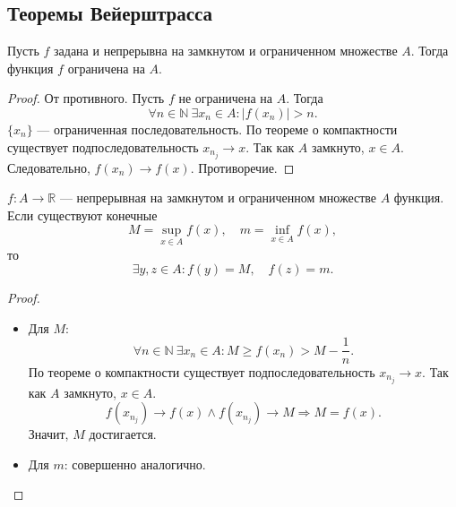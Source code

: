 \documentclass[11pt]{book}
\newcommand{\N}{\mathbb{N}}
\newcommand{\R}{\mathbb{R}}
\renewcommand{\ge}{\geqslant}
\theoremstyle{definition}
\theoremstyle{plain}
\theoremstyle{plain}
\theoremstyle{definition}
\theoremstyle{remark}
\begin{document}
\subsection{Теоремы Вейерштрасса}\label{th_ve_1}
\begin{thm}
    Пусть $ f$ задана и непрерывна на замкнутом и ограниченном множестве  $ A$. Тогда функция  $ f$ ограничена на  $ A$.
\end{thm}
\begin{proof}
    От противного. Пусть $ f$ не ограничена на $ A$. Тогда
    \[
	\forall n \in \N ~ \exists x_{n} \in A: |f(x_{n})|>n
    .\]
    $ \{x_{n}\}$ --- ограниченная последовательность. По теореме о компактности существует подпоследовательность $ x_{n_{j}} \to x$. Так как $ A$ замкнуто, $ x \in A$. Следовательно, $ f(x_{n}) \to  f(x)$. Противоречие.
\end{proof}
\begin{thm}\label{th_ve_2}
    $ f: A \to \R$ --- непрерывная на замкнутом и ограниченном множестве $ A$ функция. Если существуют конечные
    $$
    M = \sup_{x \in A}f(x), \quad m = \inf_{x \in A} f(x)
    ,
    $$
    то \[
	\exists y, z \in A: f(y) = M, \quad f(z) = m
    .\]
\end{thm}
\begin{proof}
    $ $
    \begin{itemize}
	\item Для $ M$:
	    \[
		\forall n \in \N ~ \exists x_{n} \in A: M \ge f(x_{n}) > M -\frac{1}{n}
	    .\]
	    По теореме о компактности существует подпоследовательность $ x_{n_{j}} \to x$. Так как $ A$ замкнуто, $ x \in A$.
	    \[
		f(x_{n_j}) \to  f(x) \wedge f(x_{n_{j}}) \to  M \Longrightarrow M = f(x)
	    .\]
	    Значит, $ M$ достигается.
	\item Для $ m$: совершенно аналогично.
    \end{itemize}
\end{proof}
\end{document}
